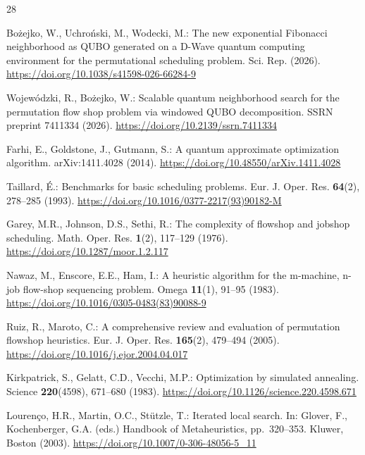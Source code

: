 \documentclass{svproc}
\newcommand{\doiurl}[1]{\mbox{\url{https://doi.org/#1}}}
\newif\ifblind
\newcommand{\rev}[1]{{\color{blue}#1}}
\newcommand{\rev}[1]{#1}
\begin{document}
\begin{thebibliography}{28}

\rev{Bo\.{z}ejko, W., Uchro\'{n}ski, M., Wodecki, M.: The new exponential
Fibonacci neighborhood as QUBO generated on a D-Wave quantum computing
environment for the permutational scheduling problem. Sci. Rep. (2026).
\doiurl{10.1038/s41598-026-66284-9}}

\ifblind
[Authors omitted for blind review]: Scalable quantum neighborhood search
for the permutation flow shop problem via windowed QUBO decomposition.
Preprint (2026)
\else
Wojew\'{o}dzki, R., Bo\.{z}ejko, W.: Scalable quantum neighborhood search
for the permutation flow shop problem via windowed QUBO decomposition.
\rev{SSRN preprint 7411334 (2026). \doiurl{10.2139/ssrn.7411334}}
\fi

Farhi, E., Goldstone, J., Gutmann, S.: A quantum approximate
optimization algorithm. arXiv:1411.4028 (2014).
\doiurl{10.48550/arXiv.1411.4028}

Taillard, \'{E}.: Benchmarks for basic scheduling problems. Eur. J. Oper.
Res. \textbf{64}(2), 278--285 (1993).
\doiurl{10.1016/0377-2217(93)90182-M}

Garey, M.R., Johnson, D.S., Sethi, R.: The complexity of flowshop and
jobshop scheduling. Math. Oper. Res. \textbf{1}(2), 117--129 (1976).
\doiurl{10.1287/moor.1.2.117}

Nawaz, M., Enscore, E.E., Ham, I.: A heuristic algorithm for the
m-machine, n-job flow-shop sequencing problem. Omega \textbf{11}(1),
91--95 (1983). \doiurl{10.1016/0305-0483(83)90088-9}

Ruiz, R., Maroto, C.: A comprehensive review and evaluation of
permutation flowshop heuristics. Eur. J. Oper. Res. \textbf{165}(2),
479--494 (2005). \doiurl{10.1016/j.ejor.2004.04.017}

Kirkpatrick, S., Gelatt, C.D., Vecchi, M.P.: Optimization by simulated
annealing. Science \textbf{220}(4598), 671--680 (1983).
\doiurl{10.1126/science.220.4598.671}

Louren\c{c}o, H.R., Martin, O.C., St\"{u}tzle, T.: Iterated local search.
In: Glover, F., Kochenberger, G.A. (eds.) Handbook of Metaheuristics,
pp.\ 320--353. Kluwer, Boston (2003).
\doiurl{10.1007/0-306-48056-5_11}


\end{thebibliography}
\end{document}
